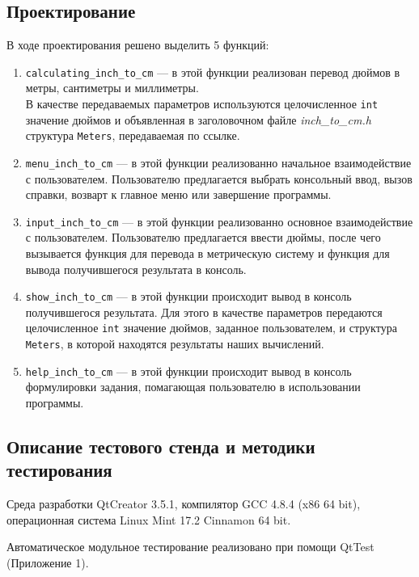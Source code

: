 \documentclass[12pt,a4paper]{report}
\begin{document}
\subsection{Проектирование}
\hspace{\parindent}В ходе проектирования решено выделить 5 функций:
\begin{enumerate}
	\item \texttt{calculating\_inch\_to\_cm} ---
	в этой функции реализован перевод дюймов в метры, сантиметры и миллиметры.
	\\В качестве передаваемых параметров используются целочисленное \texttt{int} значение дюймов и объявленная в заголовочном файле \textit{inch\_to\_cm.h} структура \texttt{Meters}, передаваемая по ссылке.
		 
	\item \texttt{menu\_inch\_to\_cm} ---
	в этой функции реализованно начальное взаимодействие с пользователем. Пользователю предлагается выбрать консольный ввод, вызов справки, возварт к главное меню или завершение программы.	
		 
	\item \texttt{input\_inch\_to\_cm} ---
	в этой функции реализованно основное взаимодействие с пользователем. Пользователю предлагается ввести дюймы, после чего вызывается функция для перевода в метрическую систему и функция для вывода получившегося результата в консоль.
	
	\item \texttt{show\_inch\_to\_cm} ---
	в этой функции происходит вывод в консоль получившегося результата. Для этого в качестве параметров передаются целочисленное \texttt{int} значение дюймов, заданное пользователем, и структура \texttt{Meters}, в которой находятся результаты наших вычислений.
	
	\item \texttt{help\_inch\_to\_cm} ---
	в этой функции происходит вывод в консоль формулировки задания, помагающая пользователю в использовании программы.
\end{enumerate}

\subsection{Описание тестового стенда и методики тестирования}
\hspace{\parindent}Среда разработки QtCreator 3.5.1, компилятор GCC 4.8.4 (x86 64 bit), операционная система Linux Mint 17.2 Cinnamon 64 bit.

Автоматическое модульное тестирование реализовано при помощи QtTest (Приложение 1).
\end{document}
